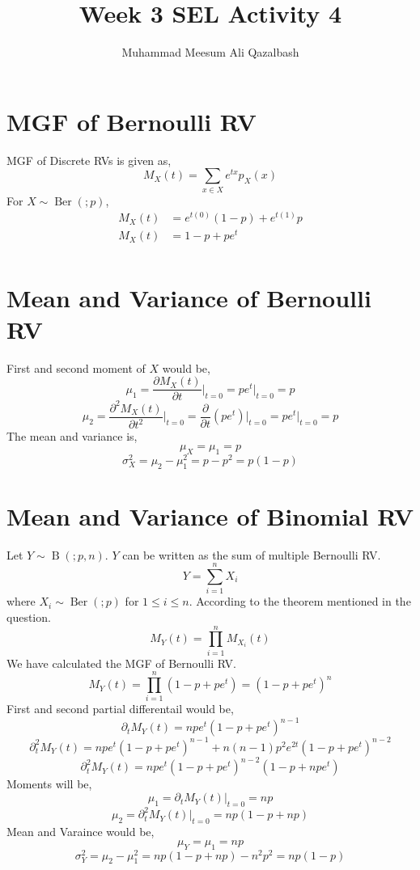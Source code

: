\documentclass{article}
\title{Week 3 SEL Activity 4}
\author{Muhammad Meesum Ali Qazalbash}
\theoremstyle{mytheoremstyle}
\theoremstyle{mytheoremstyle}
\theoremstyle{myproblemstyle}
\begin{document}
\maketitle

\section{MGF of Bernoulli RV}

MGF of Discrete RVs is given as,
\[M_{X}(t)=\sum_{x\in X}e^{tx}p_{X}(x)\]
For \(X\sim \operatorname{Ber}(;p)\),
\begin{equation}
	\begin{split}
		M_{X}(t)&=e^{t(0)}(1-p)+e^{t(1)}p\\
		M_{X}(t)&=1-p+pe^{t}\\
	\end{split}
\end{equation}

\section{Mean and Variance of Bernoulli RV}

First and second moment of \(X\) would be,
\[\mu_1=\frac{\partial M_{X}(t)}{\partial t}\bigg|_{t=0}=pe^{t}\bigg|_{t=0}=p\]
\[\mu_2=\frac{\partial^2 M_{X}(t)}{\partial t^2}\bigg|_{t=0}=\frac{\partial}{\partial t}\left(pe^{t}\right)\bigg|_{t=0}=pe^{t}\bigg|_{t=0}=p\]
The mean and variance is,
\[\mu_{X}=\mu_1=p\]
\[\sigma_{X}^{2}=\mu_2-\mu_1^2=p-p^2=p(1-p)\]

\section{Mean and Variance of Binomial RV}

Let \(Y\sim \operatorname{B}(;p,n)\). \(Y\) can be written as the sum of multiple Bernoulli RV.
\[Y=\sum_{i=1}^{n}X_i\]
where \(X_i\sim \operatorname{Ber}(;p)\) for \(1\le i\le n\). According to the theorem mentioned in the question.
\[M_{Y}(t)=\prod_{i=1}^{n}M_{X_{i}}(t)\]
We have calculated the MGF of Bernoulli RV.
\[M_{Y}(t)=\prod_{i=1}^{n}\left(1-p+pe^{t}\right)=\left(1-p+pe^{t}\right)^n\]
First and second partial differentail would be,
\[\partial_{t}M_{Y}(t)=npe^{t}\left(1-p+pe^{t}\right)^{n-1}\]
\[\partial_{t}^{2}M_{Y}(t)=npe^{t}\left(1-p+pe^{t}\right)^{n-1}+n(n-1)p^2e^{2t}\left(1-p+pe^{t}\right)^{n-2}\]
\[\partial_{t}^{2}M_{Y}(t)=npe^{t}\left(1-p+pe^{t}\right)^{n-2}\left(1-p+npe^{t}\right)\]
Moments will be,
\[\mu_1=\partial_{t}M_{Y}(t)\big|_{t=0}=np\]
\[\mu_2=\partial_{t}^{2}M_{Y}(t)\big|_{t=0}=np(1-p+np)\]
Mean and Varaince would be,
\[\mu_{Y}=\mu_{1}=np\]
\[\sigma_{Y}^2=\mu_2-\mu_1^2=np(1-p+np)-n^2p^2=np(1-p)\]
\end{document}
